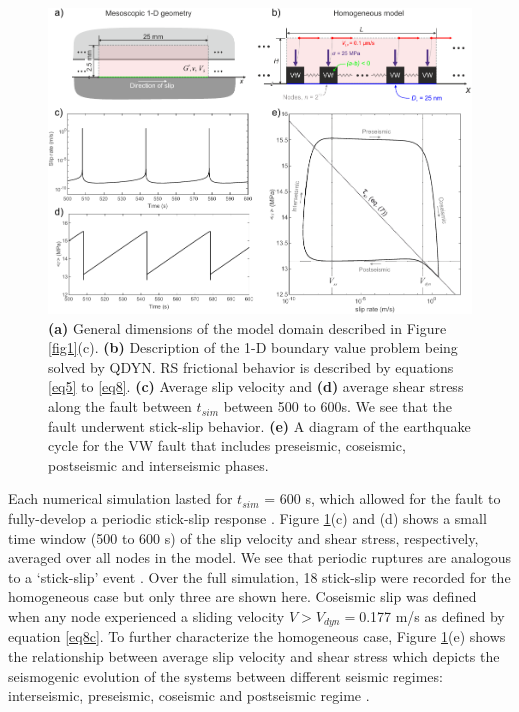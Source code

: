 \documentclass[preprint,1p, 10pt,authoryear]{elsarticle}
\begin{document}
\begin{figure}
	\centering
	\includegraphics{FIG5.pdf} 
	\caption{\textbf{(a)} General dimensions of the model domain described in Figure \ref{fig1}(c). \textbf{(b)} Description of the 1-D boundary value problem being solved by QDYN.  RS frictional behavior is described by equations \eqref{eq5} to \eqref{eq8}. \textbf{(c)} Average slip velocity and \textbf{(d)} average shear stress along the fault between $t_{sim}$ between 500 to 600s. We see that the fault underwent stick-slip behavior. \textbf{(e)} A diagram of the earthquake cycle for the VW fault that includes preseismic, coseismic, postseismic and interseismic phases.}
	\label{fig5}
\end{figure}

Each numerical simulation lasted for $t_{sim}$ = 600 s, which allowed for the fault to fully-develop a periodic stick-slip response \citep{Hillers2007}.  Figure \ref{fig5}(c) and (d) shows a small time window (500 to 600 s) of the slip velocity and shear stress, respectively, averaged over all nodes in the model.  We see that periodic ruptures are analogous to a `stick-slip' event \citep{Scholz2002}. Over the full simulation, 18 stick-slip were recorded for the homogeneous case but only three are shown here.  Coseismic slip was defined when any node experienced a sliding velocity $V > V_{dyn}=$0.177 m/s as defined by equation \eqref{eq8c}. To further characterize the homogeneous case, Figure \ref{fig5}(e) shows the relationship between average slip velocity and shear stress which depicts the seismogenic evolution of the systems between different seismic regimes: interseismic, preseismic, coseismic and postseismic regime \citep{Ampuero2008}.
\end{document}
